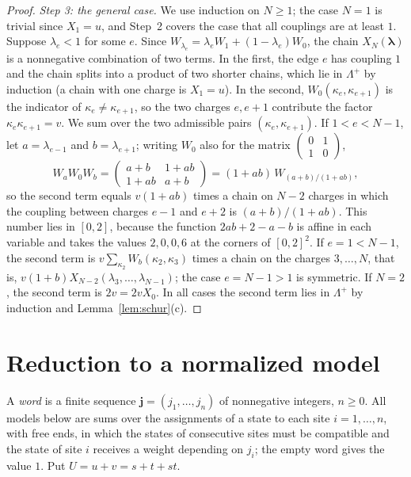 \documentclass{amsart}
\theoremstyle{definition}
\theoremstyle{remark}
\numberwithin{equation}{section}
\newcommand{\jj}{\mathbf{j}}
\newcommand{\Lp}{\Lambda^{+}}
\begin{document}
\begin{proof}
\emph{Step 3: the general case.} We use induction on $N\ge1$; the case $N=1$ is trivial since $X_1=u$, and Step~2 covers the case that all couplings are at least $1$. Suppose $\lambda_e<1$ for some $e$. Since $W_{\lambda_e}=\lambda_eW_1+(1-\lambda_e)W_0$, the chain $X_N(\boldsymbol\lambda)$ is a nonnegative combination of two terms. In the first, the edge $e$ has coupling $1$ and the chain splits into a product of two shorter chains, which lie in $\Lp$ by induction (a chain with one charge is $X_1=u$). In the second, $W_0(\kappa_e,\kappa_{e+1})$ is the indicator of $\kappa_e\ne\kappa_{e+1}$, so the two charges $e,e+1$ contribute the factor $\kappa_e\kappa_{e+1}=v$. We sum over the two admissible pairs $(\kappa_e,\kappa_{e+1})$. If $1<e<N-1$, let $a=\lambda_{e-1}$ and $b=\lambda_{e+1}$; writing $W_0$ also for the matrix $\left(\begin{smallmatrix}0&1\\1&0\end{smallmatrix}\right)$,
\[
W_aW_0W_b=\begin{pmatrix}a+b&1+ab\\ 1+ab&a+b\end{pmatrix}=(1+ab)\,W_{(a+b)/(1+ab)},
\]
so the second term equals $v(1+ab)$ times a chain on $N-2$ charges in which the coupling between charges $e-1$ and $e+2$ is $(a+b)/(1+ab)$. This number lies in $[0,2]$, because the function $2ab+2-a-b$ is affine in each variable and takes the values $2,0,0,6$ at the corners of $[0,2]^2$. If $e=1<N-1$, the second term is $v\sum_{\kappa_2}W_b(\kappa_2,\kappa_3)$ times a chain on the charges $3,\dots,N$, that is, $v(1+b)X_{N-2}(\lambda_3,\dots,\lambda_{N-1})$; the case $e=N-1>1$ is symmetric. If $N=2$, the second term is $2v=2vX_0$. In all cases the second term lies in $\Lp$ by induction and Lemma~\ref{lem:schur}(c).
\end{proof}

\section{Reduction to a normalized model}\label{sec:reduction}

A \emph{word} is a finite sequence $\jj=(j_1,\dots,j_n)$ of nonnegative integers, $n\ge0$. All models below are sums over the assignments of a state to each site $i=1,\dots,n$, with free ends, in which the states of consecutive sites must be compatible and the state of site $i$ receives a weight depending on $j_i$; the empty word gives the value $1$. Put $U=u+v=s+t+st$.
\end{document}
